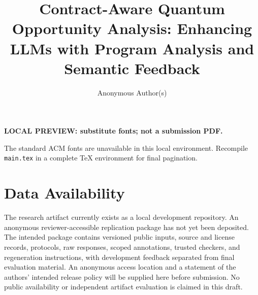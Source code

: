 \documentclass[acmsmall,screen,review,anonymous]{acmart}
\title[Contract-Aware Quantum Opportunity Analysis]{Contract-Aware Quantum Opportunity Analysis: Enhancing LLMs with Program Analysis and Semantic Feedback}
\author{Anonymous Author(s)}
\begin{document}
\maketitle
\ifdefined\localpreview
  \noindent\textbf{LOCAL PREVIEW: substitute fonts; not a submission PDF.}\par
  \noindent The standard ACM fonts are unavailable in this local environment.
  Recompile \texttt{main.tex} in a complete TeX environment for final pagination.\par
\fi









\label{page:body-end}
\clearpage
\section*{Data Availability}
\label{sec:data}
The research artifact currently exists as a local development repository. An
anonymous reviewer-accessible replication package has not yet been deposited.
The intended package contains versioned public inputs, source and license records,
protocols, raw responses, scoped annotations, trusted checkers, and regeneration
instructions, with development feedback separated from final evaluation material.
An anonymous access location and a statement of the authors' intended release
policy will be supplied here before submission. No public availability or
independent artifact evaluation is claimed in this draft.
\clearpage


\end{document}
